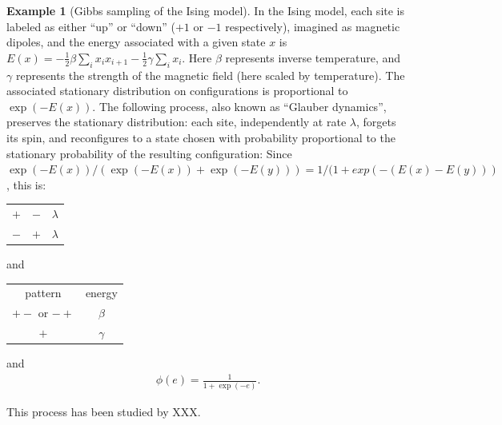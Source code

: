 \documentclass{article}
\theoremstyle{plain}
\theoremstyle{definition}
\newtheorem{example}{Example}[section]
\begin{document}
\begin{example}[Gibbs sampling of the Ising model]
    In the Ising model, each site is labeled as either ``up'' or ``down'' ($+1$ or $-1$ respectively),
    imagined as magnetic dipoles,
    and the energy associated with a given state $x$ is $E(x) = - \frac{1}{2} \beta \sum_i x_i x_{i+1} - \frac{1}{2} \gamma \sum_i x_i$.
    Here $\beta$ represents inverse temperature, and $\gamma$ represents the strength of the magnetic field (here scaled by temperature).
    The associated stationary distribution on configurations is proportional to $\exp(-E(x))$.
    The following process, also known as ``Glauber dynamics'', preserves the stationary distribution:
    each site, independently at rate $\lambda$,
    forgets its spin,
    and reconfigures to a state chosen with probability proportional to the stationary probability of the resulting configuration:
    Since $\exp(-E(x))/(\exp(-E(x))+\exp(-E(y))) = 1/(1+exp(-(E(x)-E(y)))$,
    this is:
    \begin{center}
        \begin{tabular}{c@{\quad$\to$\quad}c@{\quad at rate\quad }c}
          $+$  &   $-$   &  $\lambda$ \\
          $-$  &   $+$   &  $\lambda$ 
        \end{tabular} 
        \qquad and \qquad
        \begin{tabular}{cc}
        pattern  &  energy \\
        $+-$ or $-+$  &   $\beta$ \\
        $+$ &   $\gamma$
        \end{tabular} 
    \end{center}
    and 
    \begin{align*}
        \phi(e) = \frac{1}{1+\exp(-e)} .
    \end{align*}

    This process has been studied by XXX.
\end{example}
\end{document}
